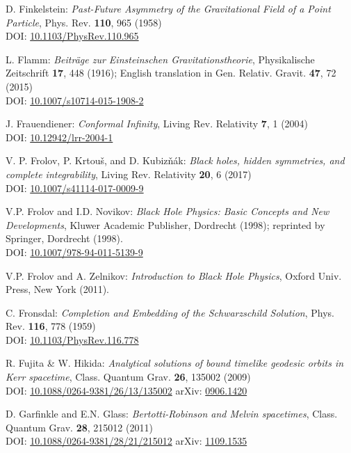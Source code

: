 \begin{thebibliography}{123}
D. Finkelstein:
{\em Past-Future Asymmetry of the Gravitational Field of a Point Particle},
Phys. Rev. {\bf 110}, 965 (1958)\\
DOI: \href{https://doi.org/10.1103/PhysRev.110.965}{10.1103/PhysRev.110.965}

L. Flamm: {\em Beiträge zur Einsteinschen Gravitationstheorie},
Physikalische Zeitschrift {\bf 17}, 448 (1916); English translation in
Gen. Relativ. Gravit. {\bf 47}, 72 (2015)\\
DOI: \href{https://doi.org/10.1007/s10714-015-1908-2}{10.1007/s10714-015-1908-2}

J. Frauendiener:
{\em Conformal Infinity},
Living Rev. Relativity {\bf 7}, 1 (2004) \\
DOI: \href{https://doi.org/10.12942/lrr-2004-1}{10.12942/lrr-2004-1}

V. P. Frolov, P. Krtouš, and D. Kubizňák:
{\em Black holes, hidden symmetries, and complete integrability},
Living Rev. Relativity {\bf 20}, 6 (2017) \\
DOI: \href{https://doi.org/10.1007/s41114-017-0009-9}{10.1007/s41114-017-0009-9}

V.P. Frolov and I.D. Novikov: {\em Black Hole Physics:
Basic Concepts and New Developments},
Kluwer Academic Publisher, Dordrecht (1998); reprinted by
Springer, Dordrecht (1998). \\
DOI: \href{https://doi.org/10.1007/978-94-011-5139-9}{10.1007/978-94-011-5139-9}

V.P. Frolov and A. Zelnikov: {\em Introduction to Black Hole Physics},
Oxford Univ. Press, New York (2011).

C. Fronsdal: {\em Completion and Embedding of the Schwarzschild Solution},
Phys. Rev. {\bf 116}, 778 (1959) \\
DOI: \href{https://doi.org/10.1103/PhysRev.116.778}{10.1103/PhysRev.116.778}

R. Fujita \& W. Hikida:
{\em Analytical solutions of bound timelike geodesic orbits in Kerr spacetime},
Class. Quantum Grav. {\bf 26}, 135002 (2009) \\
DOI: \href{https://doi.org/10.1088/0264-9381/26/13/135002}{10.1088/0264-9381/26/13/135002}\hfill
arXiv: \href{https://arxiv.org/abs/0906.1420}{0906.1420}

D. Garfinkle and E.N. Glass:
{\em Bertotti-Robinson and Melvin spacetimes},
Class. Quantum Grav. {\bf 28}, 215012 (2011)\\
DOI: \href{https://doi.org/10.1088/0264-9381/28/21/215012}{10.1088/0264-9381/28/21/215012}\hfill
arXiv: \href{https://arxiv.org/abs/1109.1535}{1109.1535}


\end{thebibliography}
